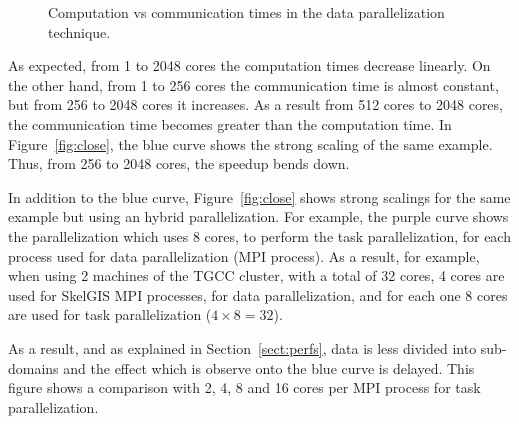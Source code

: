 \begin{figure}[!h]\begin{center}
  \caption{Computation vs communication times in the data parallelization technique.}
  \label{fig:limit}
\end{center}\end{figure}

As expected, from 1 to 2048 cores the computation times decrease linearly. On the other hand, from 1 to 256 cores the communication time is almost constant, but from 256 to 2048 cores it increases. As a result from 512 cores to 2048 cores, the communication time becomes greater than the computation time. In Figure~\ref{fig:close}, the blue curve shows the strong scaling of the same example. Thus, from 256 to 2048 cores, the speedup bends down.

\medskip
In addition to the blue curve, Figure~\ref{fig:close} shows strong scalings for the same example but using an hybrid parallelization. For example, the purple curve shows the parallelization which uses 8 cores, to perform the task parallelization, for each process used for data parallelization (\ie MPI process). As a result, for example, when using 2 machines of the TGCC cluster, with a total of 32 cores, 4 cores are used for SkelGIS MPI processes, for data parallelization, and for each one 8 cores are used for task parallelization ($4 \times 8 = 32$).

As a result, and as explained in Section~\ref{sect:perfs}, data is less divided into sub-domains and the effect which is observe onto the blue curve is delayed. This figure shows a comparison with 2, 4, 8 and 16 cores per MPI process for task parallelization.

